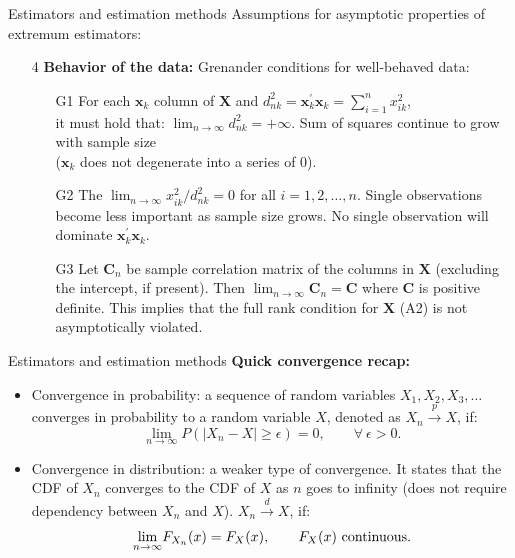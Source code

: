 \documentclass{beamer}
\begin{document}
\begin{frame}{Estimators and estimation methods}
Assumptions for asymptotic properties of extremum estimators:
\medskip
\begin{itemize}
    \item[4] \textbf{Behavior of the data:} Grenander conditions for well-behaved data:
    \medskip
    \begin{itemize}
        \item[G1] For each $\bm{x}_k$ column of $\bm{X}$ and $d_{nk}^2 = \bm{x}_k^{\prime}\bm{x}_k = \sum_{i=1}^n x_{ik}^2$, \\it must hold that: $\lim_{n \rightarrow \infty} d_{nk}^2 = + \infty$. Sum of squares continue to grow with sample size \\($\bm{x}_k$ does not degenerate into a series of 0).
        \smallskip
        \item[G2] The $\lim_{n \rightarrow \infty} x_{ik}^2 / d_{nk}^2 = 0$ for all $i=1,2,\dots,n$. Single observations become less important as sample size grows. No single observation will dominate $\bm{x}_k^{\prime}\bm{x}_k$.
        \smallskip
        \item[G3] Let $\bm{C}_n$ be sample correlation matrix of the columns in $\bm{X}$ (excluding the intercept, if present). Then $\lim_{n \rightarrow \infty} \bm{C}_n = \bm{C}$ where $\bm{C}$ is positive definite. This implies that the full rank condition for $\bm{X}$ (A2) is not asymptotically violated.
    \end{itemize}
\end{itemize}
\end{frame}
\begin{frame}{Estimators and estimation methods}
\textbf{Quick convergence recap:} \\ \bigskip
\begin{itemize}
\item Convergence in probability: a sequence of random variables $X_1, X_2, X_3, \dots$ converges in probability to a random variable $X$, denoted as $X_n \overset{p}{\rightarrow} X$, if:
$$
\underset{n \rightarrow \infty}{\lim} P (|X_n - X| \geq \epsilon)=0, \qquad \forall~ \epsilon > 0.
$$
\smallskip
\item Convergence in distribution: a weaker type of convergence. It states that the CDF of $X_n$ converges to the CDF of $X$ as $n$ goes to infinity (does not require dependency between $X_n$ and $X$). $X_n \overset{d}{\rightarrow} X$, if: 
$$
\underset{n \rightarrow \infty}{\lim} F_{X_n}(x) = F_X(x), \qquad F_X(x) \textnormal{~continuous.}
$$
\end{itemize}
\end{frame}
\end{document}
